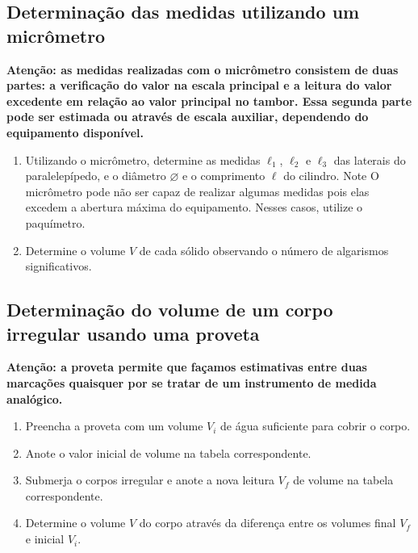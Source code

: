 \subsection{Determinação das medidas utilizando um micrômetro}

\textbf{Atenção: as medidas realizadas com o micrômetro consistem de duas partes: a verificação do valor na escala principal e a leitura do valor excedente em relação ao valor principal no tambor. Essa segunda parte pode ser estimada ou através de escala auxiliar, dependendo do equipamento disponível.}

\begin{enumerate}
\item Utilizando o micrômetro, determine as medidas $\ell_1$, $\ell_2$ e $\ell_3$ das laterais do paralelepípedo, e o diâmetro $\diameter$ e o comprimento $\ell$ do cilindro. Note O micrômetro pode não ser capaz de realizar algumas medidas pois elas excedem a abertura máxima do equipamento. Nesses casos, utilize o paquímetro.
\item Determine o volume $V$ de cada sólido observando o número de algarismos significativos.
\end{enumerate}


\subsection{Determinação do volume de um corpo irregular usando uma proveta}

\textbf{Atenção: a proveta permite que façamos estimativas entre duas marcações quaisquer por se tratar de um instrumento de medida analógico.}

\begin{enumerate}
    \item Preencha a proveta com um volume $V_i$ de água suficiente para cobrir o corpo.
    \item Anote o valor inicial de volume na tabela correspondente.
    \item Submerja o corpos irregular e anote a nova leitura $V_f$ de volume na tabela correspondente.
    \item Determine o volume $V$ do corpo através da diferença entre os volumes final $V_f$ e inicial $V_i$.
\end{enumerate}

